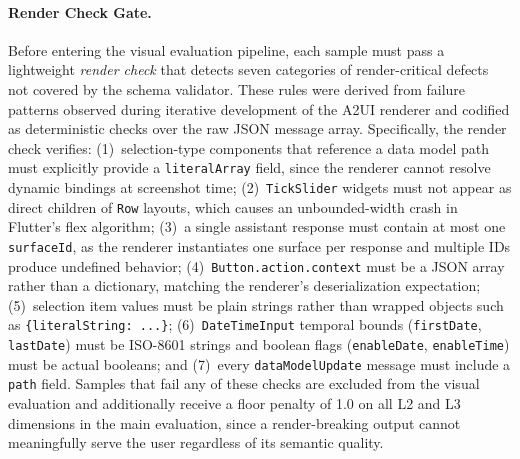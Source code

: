 \documentclass{llmxive}
\begin{document}
\paragraph{Render Check Gate.}
Before entering the visual evaluation pipeline, each sample must pass a lightweight \emph{render check} that detects seven categories of render-critical defects not covered by the schema validator. These rules were derived from failure patterns observed during iterative development of the A2UI renderer and codified as deterministic checks over the raw JSON message array. Specifically, the render check verifies: (1)~selection-type components that reference a data model path must explicitly provide a \texttt{literalArray} field, since the renderer cannot resolve dynamic bindings at screenshot time; (2)~\texttt{TickSlider} widgets must not appear as direct children of \texttt{Row} layouts, which causes an unbounded-width crash in Flutter's flex algorithm; (3)~a single assistant response must contain at most one \texttt{surfaceId}, as the renderer instantiates one surface per response and multiple IDs produce undefined behavior; (4)~\texttt{Button.action.context} must be a JSON array rather than a dictionary, matching the renderer's deserialization expectation; (5)~selection item values must be plain strings rather than wrapped objects such as \texttt{\{literalString: ...\}}; (6)~\texttt{DateTimeInput} temporal bounds (\texttt{firstDate}, \texttt{lastDate}) must be ISO-8601 strings and boolean flags (\texttt{enableDate}, \texttt{enableTime}) must be actual booleans; and (7)~every \texttt{dataModelUpdate} message must include a \texttt{path} field. Samples that fail any of these checks are excluded from the visual evaluation and additionally receive a floor penalty of 1.0 on all L2 and L3 dimensions in the main evaluation, since a render-breaking output cannot meaningfully serve the user regardless of its semantic quality.
\end{document}
